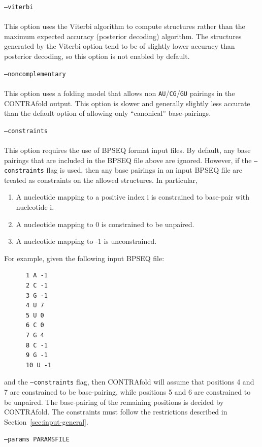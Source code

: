 \documentclass{article}
\begin{document}
\begin{description}
  \item \texttt{--viterbi} \\
    \\
    This option uses the Viterbi algorithm to compute structures rather than the
    maximum expected accuracy (posterior decoding) algorithm.  The structures generated
    by the Viterbi option tend to be of slightly lower accuracy than posterior decoding,
    so this option is not enabled by default.
  \item \texttt{--noncomplementary} \\
    \\
    This option uses a folding model that allows non \texttt{AU}/\texttt{CG}/\texttt{GU} 
    pairings in the CONTRAfold output.  This option is slower and generally slightly less
    accurate than the default option of allowing only ``canonical'' base-pairings.
  \item \texttt{--constraints} \\
    \\
    This option requires the use of BPSEQ format input files.
    By default, any base pairings that are included in the BPSEQ file
    above are ignored.  However, if the \texttt{--constraints} flag is used,
    then any base pairings in an input BPSEQ file are treated as
    constraints on the allowed structures.  In particular,
    \begin{enumerate}
    \item A nucleotide mapping to a positive index i is constrained to
      base-pair with nucleotide i.
    \item A nucleotide mapping to 0 is constrained to be unpaired.
    \item A nucleotide mapping to -1 is unconstrained.
    \end{enumerate}
    For example, given the following input BPSEQ file:
    \begin{verbatim}
      1 A -1
      2 C -1
      3 G -1
      4 U 7
      5 U 0
      6 C 0
      7 G 4
      8 C -1
      9 G -1
      10 U -1\end{verbatim}
    and the \texttt{--constraints} flag, then CONTRAfold will assume that
    positions 4 and 7 are constrained to be base-pairing, while positions
    5 and 6 are constrained to be unpaired.  The base-pairing of the
    remaining positions is decided by CONTRAfold.  The constraints must follow
    the restrictions described in Section~\ref{sec:input-general}.
  \item \texttt{--params PARAMSFILE} \\

\end{description}
\end{document}
